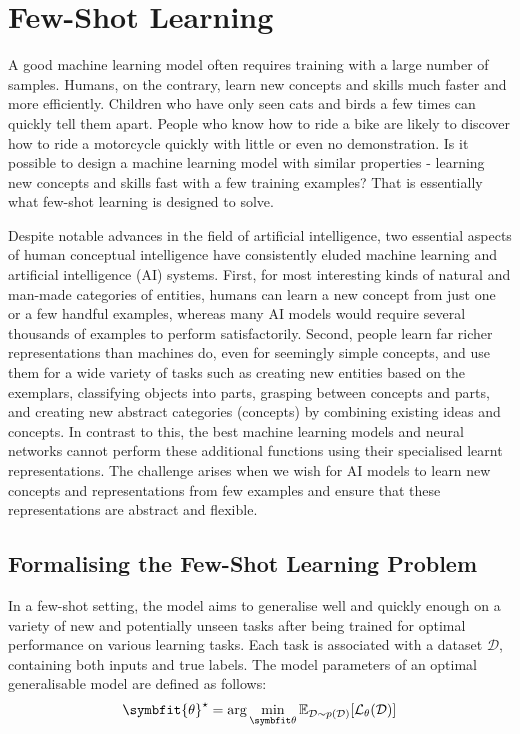 \chapter{Few-Shot Learning}\label{chap:fsl}
A good machine learning model often requires training with a large number of samples. Humans, on the contrary, learn new concepts and skills much faster and more efficiently. Children who have only seen cats and birds a few times can quickly tell them apart. People who know how to ride a bike are likely to discover how to ride a motorcycle quickly with little or even no demonstration. Is it possible to design a machine learning model with similar properties - learning new concepts and skills fast with a few training examples? That is essentially what few-shot learning is designed to solve.

Despite notable advances in the field of artificial intelligence, two essential aspects of human conceptual intelligence have consistently eluded machine learning and artificial intelligence (AI) systems. First, for most interesting kinds of natural and man-made categories of entities, humans can learn a new concept from just one or a few handful examples, whereas many AI models would require several thousands of examples to perform satisfactorily. Second, people learn far richer representations than machines do, even for seemingly simple concepts, and use them for a wide variety of tasks such as creating new entities based on the exemplars, classifying objects into parts, grasping between concepts and parts, and creating new abstract categories (concepts) by combining existing ideas and concepts. In contrast to this, the best machine learning models and neural networks cannot perform these additional functions using their specialised learnt representations. The challenge arises when we wish for AI models to learn new concepts and representations from few examples and ensure that these representations are abstract and flexible.

\section{Formalising the Few-Shot Learning Problem}\label{sec:formalising-fsl}

In a few-shot setting, the model aims to generalise well and quickly enough on a variety of new and potentially unseen tasks after being trained for optimal performance on various learning tasks.
Each task is associated with a dataset $\mathcal{D}$, containing both inputs and true labels. 
The model parameters of an optimal generalisable model are defined as follows:
\begin{equation}
    \symbfit{\theta}^\star = \arg\min_{\symbfit \theta} \mathbb{E}_{\mathcal{D}\sim p(\mathcal{D})} [\mathcal{L}_\theta(\mathcal{D})]
\end{equation}

